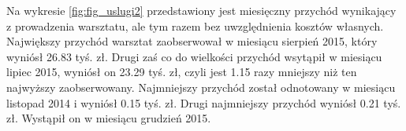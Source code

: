 \documentclass{article}\usepackage[]{graphicx}\usepackage[]{xcolor}
\begin{document}
Na wykresie \ref{fig:fig_uslugi2} przedstawiony jest miesięczny przychód wynikający z prowadzenia warsztatu, ale tym razem bez uwzględnienia kosztów własnych. 
Największy przychód warsztat zaobserwował w miesiącu sierpień 2015, który wyniósł 26.83 tyś. zł.
Drugi zaś co do wielkości przychód wsytąpił w miesiącu lipiec 2015, wyniósł on 23.29 tyś. zł, czyli jest 1.15 razy mniejszy niż ten najwyższy zaobserwowany.
Najmniejszy przychód został odnotowany w miesiącu listopad 2014 i wyniósł 0.15 tyś. zł. 
Drugi najmniejszy przychód wyniósł 0.21 tyś. zł. Wystąpił on w miesiącu grudzień 2015.
\end{document}
